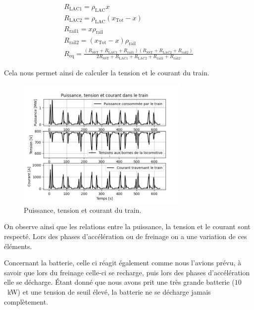 \documentclass[11pt, a4paper, oneside, portrait]{report}
\begin{document}
            \begin{gather*}
                R_{\text{LAC1}} = \rho_{\text{LAC}} x\\
                R_{\text{LAC2}} = \rho_{\text{LAC}} \left(x_{\text{Tot}}-x\right)\\
                R_\text{rail1} = x\rho_\text{rail}\\
                R_\text{rail2} = \left(x_\text{Tot}-x\right)\rho_\text{rail}\\
                R_\text{eq} = \frac{\left(R_\text{SST}+R_\text{LAC1}+R_\text{rail1}\right)\left(R_\text{SST}+R_\text{LAC2}+R_\text{rail2}\right)}{2R_\text{SST}+R_\text{LAC1}+R_\text{LAC2}+R_\text{rail1}+R_\text{rail2}}
            \end{gather*}

            Cela nous permet ainsi de calculer la tension et le courant du train.

            \begin{figure}[H]
                \centering
                \includegraphics[width=0.75\textwidth]{Figures/PTI.png}
                \caption{Puissance, tension et courant du train.}
                \label{fig:PTI}
            \end{figure}

            On observe ainsi que les relations entre la puissance, la tension et le courant sont respecté. Lors
            des phases d’accélération ou de freinage on a une variation de ces éléments.

            Concernant la batterie, celle ci réagit également comme nous l’avions prévu, à savoir que lors du
            freinage celle-ci se recharge, puis lors des phases d’accélération elle se décharge. Étant donné
            que nous avons prit une très grande batterie ($10$~kW) et une tension de seuil élevé, la batterie ne se
            décharge jamais complètement.
\end{document}
